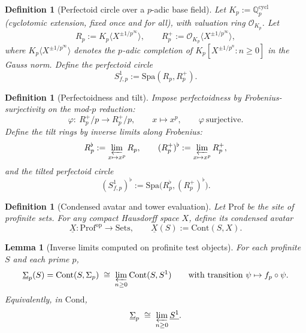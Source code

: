 \documentclass[11pt]{article}
\newtheorem{lemma}[theorem]{Lemma}
\newtheorem{definition}[theorem]{Definition}
\theoremstyle{remark}
\begin{document}
{\begin{definition}[Perfectoid circle over a $p$-adic base field]\label{D:def:perfectoid_circle}
Let $K_{p}:=\mathbb Q_{p}^{\mathrm{cycl}}$ (cyclotomic extension, fixed once and for all), with valuation ring $\mathcal O_{K_{p}}$.
Let
\begin{equation}
R_{p}:=K_{p}\langle X^{\pm 1/p^{\infty}}\rangle,\qquad
R_{p}^{+}:=\mathcal O_{K_{p}}\langle X^{\pm 1/p^{\infty}}\rangle,
\label{D:eq:Rp}
\end{equation}
where $K_{p}\langle X^{\pm 1/p^{\infty}}\rangle$ denotes the $p$-adic completion of $K_{p}[X^{\pm 1/p^{n}}:n\ge 0]$ in the Gauss norm.
Define the perfectoid circle
\begin{equation}
S^{1}_{f,p}:=\mathrm{Spa}(R_{p},R_{p}^{+}).
\label{D:eq:Sfp}
\end{equation}
\end{definition}

\begin{definition}[Perfectoidness and tilt]\label{D:def:tilt}
Impose perfectoidness by Frobenius-surjectivity on the mod-$p$ reduction:
\begin{equation}
\varphi:\ R_{p}^{+}/p \longrightarrow R_{p}^{+}/p,\qquad x\longmapsto x^{p},\qquad \varphi \ \text{surjective}.
\label{D:eq:Frob_surj}
\end{equation}
Define the tilt rings by inverse limits along Frobenius:
\begin{equation}
R_{p}^{\flat}:=\varprojlim_{x\mapsto x^{p}}R_{p},\qquad
(R_{p}^{+})^{\flat}:=\varprojlim_{x\mapsto x^{p}}R_{p}^{+},
\label{D:eq:tilt_rings}
\end{equation}
and the tilted perfectoid circle
\begin{equation}
(S^{1}_{f,p})^{\flat}:=\mathrm{Spa}\bigl(R_{p}^{\flat},(R_{p}^{+})^{\flat}\bigr).
\label{D:eq:tilt_circle}
\end{equation}
\end{definition} 
\begin{definition}[Condensed avatar and tower evaluation]\label{D:def:condensed_avatar}
Let $\mathrm{Prof}$ be the site of profinite sets.
For any compact Hausdorff space $X$, define its condensed avatar
\begin{equation}
\underline{X}:\mathrm{Prof}^{\mathrm{op}}\to \mathrm{Sets},\qquad
\underline{X}(S):=\mathrm{Cont}(S,X).
\label{D:eq:condensedX}
\end{equation}
\end{definition}

\begin{lemma}[Inverse limits computed on profinite test objects]\label{D:lem:Cont_commutes}
For each profinite $S$ and each prime $p$,
\begin{equation}
\underline{\Sigma}_{p}(S)
=\mathrm{Cont}(S,\Sigma_{p})
\;\cong\;
\varprojlim_{n\ge 0}\mathrm{Cont}(S,S^{1})
\qquad\text{with transition }\psi\mapsto f_{p}\circ \psi.
\label{D:eq:Cont_limit}
\end{equation}
Equivalently, in $\mathrm{Cond}$,
\begin{equation}
\underline{\Sigma}_{p}\;\cong\;\varprojlim_{n\ge 0}\underline{S^{1}}.
\label{D:eq:Cond_limit}
\end{equation}
\end{lemma}

}
\end{document}
